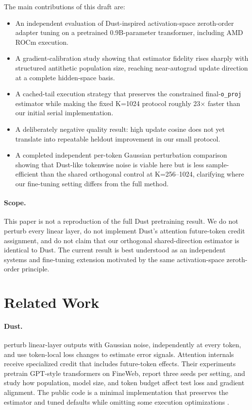 \documentclass[11pt]{article}
\newcommand{\oproj}{\texttt{o\_proj}}
\begin{document}
The main contributions of this draft are:
\begin{itemize}
    \item An independent evaluation of Dust-inspired activation-space
    zeroth-order adapter tuning on a pretrained 0.9B-parameter transformer,
    including AMD ROCm execution.
    \item A gradient-calibration study showing that estimator fidelity rises
    sharply with structured antithetic population size, reaching near-autograd
    update direction at a complete hidden-space basis.
    \item A cached-tail execution strategy that preserves the constrained
    final-\oproj{} estimator while making the fixed K=1024 protocol roughly
    23$\times$ faster than our initial serial implementation.
    \item A deliberately negative quality result: high update cosine does not
    yet translate into repeatable heldout improvement in our small protocol.
    \item A completed independent per-token Gaussian perturbation
    comparison showing that Dust-like tokenwise noise is viable here but is
    less sample-efficient than the shared orthogonal control at K=256--1024,
    clarifying where our fine-tuning setting differs from the full method.
\end{itemize}

\paragraph{Scope.}
This paper is not a reproduction of the full Dust pretraining result. We do
not perturb every linear layer, do not implement Dust's attention
future-token credit assignment, and do not claim that our orthogonal
shared-direction estimator is identical to Dust. The current result is best
understood as an independent systems and fine-tuning extension motivated by
the same activation-space zeroth-order principle.

\section{Related Work}

\paragraph{Dust.}
\citet{dahal2026dust} perturb linear-layer outputs with Gaussian noise,
independently at every token, and use token-local loss changes to estimate
error signals. Attention internals receive specialized credit that includes
future-token effects. Their experiments pretrain GPT-style transformers on
FineWeb, report three seeds per setting, and study how population, model size,
and token budget affect test loss and gradient alignment. The public code is a
minimal implementation that preserves the estimator and tuned defaults while
omitting some execution optimizations \citep{qlabsdustcode}.
\end{document}

